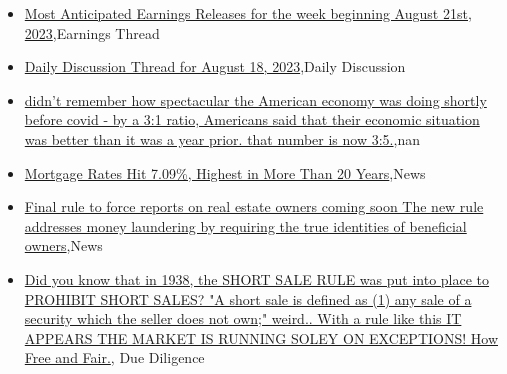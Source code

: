 \documentclass{article}%
\begin{document}
%
\begin{itemize}%
\item%
\href{https://reddit.com/r/wallstreetbets/comments/15ujda2/most\_anticipated\_earnings\_releases\_for\_the\_week/}{Most Anticipated Earnings Releases for the week beginning August 21st, 2023},Earnings Thread%
\item%
\href{https://reddit.com/r/wallstreetbets/comments/15ug75e/daily\_discussion\_thread\_for\_august\_18\_2023/}{Daily Discussion Thread for August 18, 2023},Daily Discussion%
\item%
\href{https://reddit.com/r/Economics/comments/15ua99p/didnt\_remember\_how\_spectacular\_the\_american/}{didn't remember how spectacular the American economy was doing shortly before covid - by a 3:1 ratio, Americans said that their economic situation was better than it was a year prior. that number is now 3:5.},nan%
\item%
\href{https://reddit.com/r/Economics/comments/15u7lnr/mortgage\_rates\_hit\_709\_highest\_in\_more\_than\_20/}{Mortgage Rates Hit 7.09\%, Highest in More Than 20 Years},News%
\item%
\href{https://reddit.com/r/Economics/comments/15u1wtl/final\_rule\_to\_force\_reports\_on\_real\_estate\_owners/}{Final rule to force reports on real estate owners coming soon  The new rule addresses money laundering by requiring the true identities of beneficial owners},News%
\item%
\href{https://reddit.com/r/Superstonk/comments/15uiadk/did\_you\_know\_that\_in\_1938\_the\_short\_sale\_rule\_was/}{Did you know that in 1938, the SHORT SALE RULE was put into place to PROHIBIT SHORT SALES? "A short sale is defined as (1) any sale of a security which the seller does not own;" weird.. With a rule like this IT APPEARS THE MARKET IS RUNNING SOLEY ON EXCEPTIONS! How Free and Fair.}, Due Diligence%
\end{itemize}%
\end{document}
